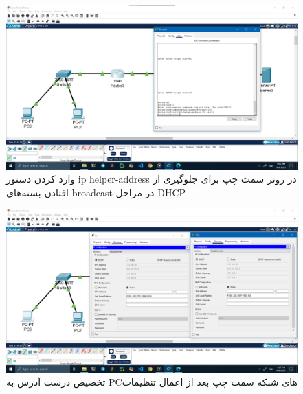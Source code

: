 \documentclass[12pt]{article}
\begin{document}
	\begin{figure}[H]
		\centering
		\includegraphics[width=\textwidth]{resources/scenario2-13.png}
		\caption{وارد کردن دستور \textenglish{ip helper-address} در روتر سمت چپ برای جلوگیری از افتادن بسته‌های \textenglish{broadcast} در مراحل \textenglish{DHCP}}
		\label{2:13}
	\end{figure}
	\begin{figure}[H]
		\centering
		\includegraphics[width=\textwidth]{resources/scenario2-14.png}
		\caption{تخصیص درست آدرس به \textenglish{PC}‌های شبکه سمت چپ بعد از اعمال تنظیمات}
		\label{2:14}
	\end{figure}
	\newpage
\end{document}
